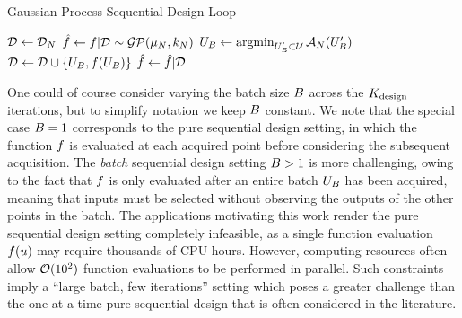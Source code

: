 \documentclass[12pt]{article}
\begin{document}
\begin{algorithm}
    \caption{Gaussian Process Sequential Design Loop}
    \label{alg:seq_des_loop}
    \begin{algorithmic}[1] %
    	\State $\design[] \gets \design[\Ndesign]$ 
	\State $\hat{f} \gets f|\design[] \sim \GP(\gpMean[\Ndesign], \gpKer[\Ndesign])$
         
        		\State $\designBatchIn \gets \argmin_{\designBatchIn^\prime \subset \parSpace} \acq[\Ndesign](\designBatchIn^\prime)$ 
		\State $\design[] \gets \design[] \cup \{\designBatchIn, \func(\designBatchIn)\}$
		\State $\hat{f} \gets \hat{f} | \design[]$
	\EndFor
	\EndFunction
    \end{algorithmic}
\end{algorithm}

One could of course consider 
varying the batch size $\Nbatch$ across the $\Nrounds$ iterations, but to simplify notation we keep $\Nbatch$ constant. We note that the 
special case $\Nbatch = 1$ corresponds to the pure sequential design setting, in which the function $\func$ is evaluated at each acquired 
point before considering the subsequent acquisition. The \textit{batch} sequential design setting $\Nbatch > 1$ is more challenging,  
owing to the fact that $\func$ is only evaluated after an entire batch $\designBatchIn$ has been acquired, meaning that inputs must 
be selected without observing the outputs of the other points in the batch. The applications motivating this work render the 
pure sequential design setting completely infeasible, as a single function evaluation $f(\Par)$ may require thousands of CPU hours. 
However, computing resources often allow $\BigO(10^2)$ function evaluations to be performed in parallel. Such constraints imply a 
``large batch, few iterations'' setting which poses a greater challenge than the one-at-a-time pure sequential design that is 
often considered in the literature.
\end{document}
